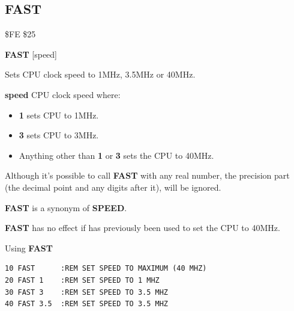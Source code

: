 
\newpage
\subsection{FAST}
\begin{description}[leftmargin=2cm,style=nextline]
\item [Token:] \$FE \$25
\item [Format:] {\bf FAST} [speed]
\item [Usage:] Sets CPU clock speed to 1MHz, 3.5MHz or 40MHz.

                {\bf speed} CPU clock speed where:
                \begin{itemize}
                    \item {\bf 1} sets CPU to 1MHz.
                    \item {\bf 3} sets CPU to 3MHz.
                    \item Anything other than {\bf 1} or {\bf 3} sets the CPU to 40MHz.
                \end{itemize}
\item [Remarks:] Although it's possible to call {\bf FAST}
                 with any real number, the precision part (the decimal point
                 and any digits after it), will be ignored.

                 {\bf FAST} is a synonym of {\bf SPEED}.

                 {\bf FAST} has no effect if 
                 has previously been used to set the CPU to 40MHz.

\item [Example:] Using {\bf FAST}
\begin{tcolorbox}[colback=black,coltext=white]
\verbatimfont{\codefont}
\begin{verbatim}
10 FAST      :REM SET SPEED TO MAXIMUM (40 MHZ)
20 FAST 1    :REM SET SPEED TO 1 MHZ
30 FAST 3    :REM SET SPEED TO 3.5 MHZ
40 FAST 3.5  :REM SET SPEED TO 3.5 MHZ
\end{verbatim}
\end{tcolorbox}
\end{description}


\newpage
